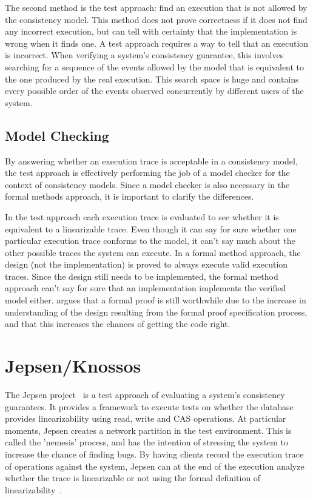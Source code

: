\documentclass[12pt,conference]{IEEEtran}
\begin{document}
The second method is the test approach: find an execution that is not allowed by the consistency model. This method does not prove correctness if it does not find any incorrect execution, but can tell with certainty that the implementation is wrong when it finds one. A test approach requires a way to tell that an execution is incorrect. When verifying a system's consistency guarantee, this involves searching for a sequence of the events allowed by the model that is equivalent to the one produced by the real execution. This search space is huge and contains every possible order of the events observed concurrently by different users of the system. 

\subsection{Model Checking}

By answering whether an execution trace is acceptable in a consistency model, the test approach is effectively performing the job of a model checker for the context of consistency models. Since a model checker is also necessary in the formal methods approach, it is important to clarify the differences. 

In the test approach each execution trace is evaluated to see whether it is equivalent to a linearizable trace. Even though it can say for sure whether one particular execution trace conforms to the model, it can't say much about the other possible traces the system can execute. In a formal method approach, the design (not the implementation) is proved to always execute valid execution traces. Since the design still needs to be implemented, the formal method approach can't say for sure that an implementation implements the verified model either. \cite{newcombe2014use} argues that a formal proof is still worthwhile due to the increase in understanding of the design resulting from the formal proof specification process, and that this increases the chances of getting the code right.

\section{Jepsen/Knossos}

The Jepsen project~\cite{jepsenWebsite, jepsenGithubWebsite} is a test approach of evaluating a system's consistency guarantees. It provides a framework to execute tests on whether the database provides linearizability using read, write and CAS operations. At particular moments, Jepsen creates a network partition in the test environment. This is called the 'nemesis' process, and has the intention of stressing the system to increase the chance of finding bugs. By having clients record the execution trace of operations against the system, Jepsen can at the end of the execution analyze whether the trace is linearizable or not using the formal definition of linearizability~\cite{dziuma2013survey}.
\end{document}
